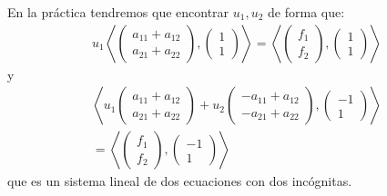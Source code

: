 \documentclass[10pt,handout]{beamer}
\theoremstyle{plain} %
\theoremstyle{plain} %
\theoremstyle{plain} %
\theoremstyle{plain} %
\theoremstyle{definition}
\theoremstyle{example}
\theoremstyle{example}
\theoremstyle{remark}
\theoremstyle{remark}
\begin{document}
\begin{frame}
En la práctica tendremos que encontrar $u_1,u_2$ de forma que:
\begin{align*}
u_1 \left\langle  \left(
\begin{array}{c}
a_{11}+a_{12} \\ 
a_{21}+a_{22}
\end{array}
\right), \left(
\begin{array}{c}
1 \\ 
1
\end{array}
\right) \right\rangle  = \left\langle \left(
\begin{array}{c}
f_1 \\ 
f_2
\end{array} \right),  \left(
\begin{array}{c}
1 \\ 
1
\end{array}
\right)\right\rangle
\end{align*}
y
\begin{align*}
\left\langle  u_1 \left(
\begin{array}{c}
a_{11}+a_{12} \\ 
a_{21}+a_{22}
\end{array}
\right) + u_2 \left(
\begin{array}{c}
-a_{11}+a_{12} \\ 
-a_{21}+a_{22}
\end{array}
\right),  \left(
\begin{array}{r}
-1 \\ 
1
\end{array}
\right)\right\rangle  \\ = \left\langle \left(
\begin{array}{c}
f_1 \\ 
f_2
\end{array} \right),  \left(
\begin{array}{r}
-1 \\ 
1
\end{array}
\right)\right\rangle
\end{align*}
que es un sistema lineal de dos ecuaciones con dos incógnitas.
\end{frame}
\end{document}
